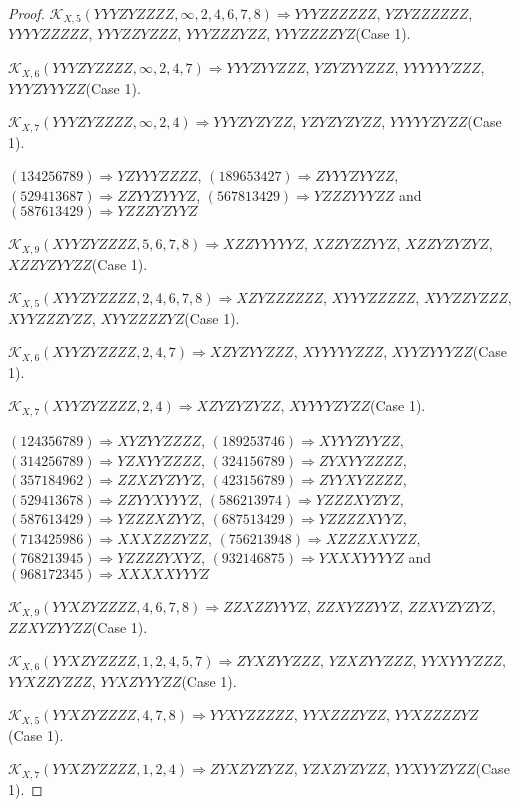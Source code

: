 \documentclass[12pt]{article}
\theoremstyle{plain}
\theoremstyle{definition}
\theoremstyle{remark}
\newcommand{\fancy}[1]{\mathcal{#1}}
\def\K{\fancy{K}}
\begin{document}
\begin{proof}
	$\K_{X,5}(YYYZYZZZZ,\infty,2, 4, 6, 7, 8)\Rightarrow $$YYYZZZZZZ$, $YZYZZZZZZ$, $YYYYZZZZZ$, $YYYZZYZZZ$, $YYYZZZYZZ$, $YYYZZZZYZ$(Case 1).
	
	$\K_{X,6}(YYYZYZZZZ,\infty,2, 4, 7)\Rightarrow $$YYYZYYZZZ$, $YZYZYYZZZ$, $YYYYYYZZZ$, $YYYZYYYZZ$(Case 1).
	
	$\K_{X,7}(YYYZYZZZZ,\infty,2, 4)\Rightarrow $$YYYZYZYZZ$, $YZYZYZYZZ$, $YYYYYZYZZ$(Case 1).
	
	
	
	$(1 3 4 2 5 6 7 8 9)\Rightarrow YZYYYZZZZ$, $(1 8 9 6 5 3 4 2 7)\Rightarrow ZYYYZYYZZ$, $(5 2 9 4 1 3 6 8 7)\Rightarrow ZZYYZYYYZ$, $(5 6 7 8 1 3 4 2 9)\Rightarrow YZZZYYYZZ$ and $(5 8 7 6 1 3 4 2 9)\Rightarrow YZZZYZYYZ$
	
	
	$\K_{X,9}(XYYZYZZZZ,5, 6, 7, 8)\Rightarrow $$XZZYYYYYZ$, $XZZYZZYYZ$, $XZZYZYZYZ$, $XZZYZYYZZ$(Case 1).
	
	$\K_{X,5}(XYYZYZZZZ,2, 4, 6, 7, 8)\Rightarrow $$XZYZZZZZZ$, $XYYYZZZZZ$, $XYYZZYZZZ$, $XYYZZZYZZ$, $XYYZZZZYZ$(Case 1).
	
	$\K_{X,6}(XYYZYZZZZ,2, 4, 7)\Rightarrow $$XZYZYYZZZ$, $XYYYYYZZZ$, $XYYZYYYZZ$(Case 1).
	
	$\K_{X,7}(XYYZYZZZZ,2, 4)\Rightarrow $$XZYZYZYZZ$, $XYYYYZYZZ$(Case 1).
	
	
	
	$(1 2 4 3 5 6 7 8 9)\Rightarrow XYZYYZZZZ$, $(1 8 9 2 5 3 7 4 6)\Rightarrow XYYYZYYZZ$, $(3 1 4 2 5 6 7 8 9)\Rightarrow YZXYYZZZZ$, $(3 2 4 1 5 6 7 8 9)\Rightarrow ZYXYYZZZZ$, $(3 5 7 1 8 4 9 6 2)\Rightarrow ZZXZYZYYZ$, $(4 2 3 1 5 6 7 8 9)\Rightarrow ZYYXYZZZZ$, $(5 2 9 4 1 3 6 7 8)\Rightarrow ZZYYXYYYZ$, $(5 8 6 2 1 3 9 7 4)\Rightarrow YZZZXYZYZ$, $(5 8 7 6 1 3 4 2 9)\Rightarrow YZZZXZYYZ$, $(6 8 7 5 1 3 4 2 9)\Rightarrow YZZZZXYYZ$, $(7 1 3 4 2 5 9 8 6)\Rightarrow XXXZZZYZZ$, $(7 5 6 2 1 3 9 4 8)\Rightarrow XZZZXXYZZ$, $(7 6 8 2 1 3 9 4 5)\Rightarrow YZZZZYXYZ$, $(9 3 2 1 4 6 8 7 5)\Rightarrow YXXXYYYYZ$ and $(9 6 8 1 7 2 3 4 5)\Rightarrow XXXXXYYYZ$
	
	
	$\K_{X,9}(YYXZYZZZZ,4, 6, 7, 8)\Rightarrow $$ZZXZZYYYZ$, $ZZXYZZYYZ$, $ZZXYZYZYZ$, $ZZXYZYYZZ$(Case 1).
	
	$\K_{X,6}(YYXZYZZZZ,1, 2, 4, 5, 7)\Rightarrow $$ZYXZYYZZZ$, $YZXZYYZZZ$, $YYXYYYZZZ$, $YYXZZYZZZ$, $YYXZYYYZZ$(Case 1).
	
	$\K_{X,5}(YYXZYZZZZ,4, 7, 8)\Rightarrow $$YYXYZZZZZ$, $YYXZZZYZZ$, $YYXZZZZYZ$(Case 1).
	
	$\K_{X,7}(YYXZYZZZZ,1, 2, 4)\Rightarrow $$ZYXZYZYZZ$, $YZXZYZYZZ$, $YYXYYZYZZ$(Case 1).
	

\end{proof}
\end{document}
